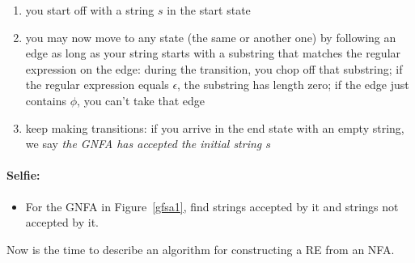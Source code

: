\begin{enumerate}
\item you start off with a string $s$ in the start state
\item you may now move to any state (the same or another one) by
following an edge as long as your string starts with a substring that
matches the regular expression on the edge: during the transition, you
chop off that substring; if the regular expression equals $\epsilon$,
the substring has length zero; if the edge just contains $\phi$, you
can't take that edge
\item keep making transitions: if you arrive in the end state with an
empty string, we say {\em the GNFA has accepted the initial string $s$}
\end{enumerate}


\paragraph{Selfie:}
\begin{itemize}
\item[]
For the GNFA in Figure~\ref{gfsa1}, find strings accepted by it and
strings not accepted by it.
\end{itemize}



Now is the time to describe an algorithm for constructing a RE from an NFA.

